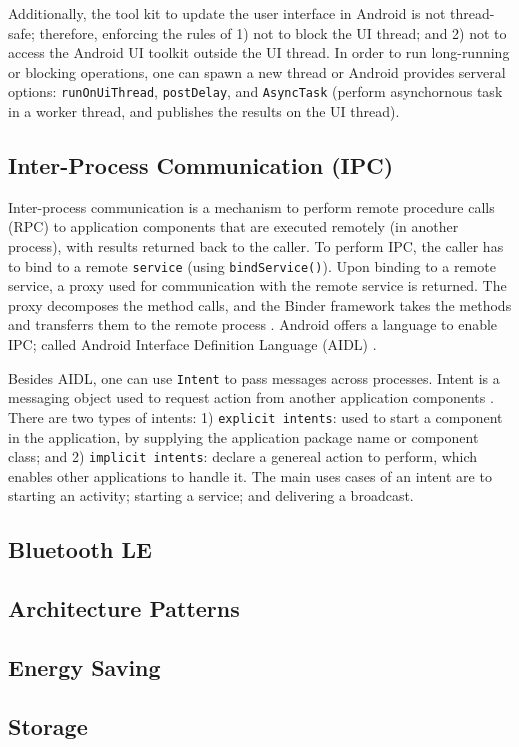 Additionally, the tool kit to update the user interface in Android is not thread-safe; therefore, enforcing the rules of 1) not to block the UI thread; and 2) not to access the Android UI toolkit outside the UI thread. In order to run long-running or blocking operations, one can spawn a new thread or Android provides serveral options: \verb|runOnUiThread|, \verb|postDelay|, and \verb|AsyncTask| (perform asynchornous task in a worker thread, and publishes the results  on the UI thread). 

\subsection{Inter-Process Communication (IPC)}
Inter-process communication is a mechanism to perform remote procedure calls (RPC) to application components that are executed remotely (in another process), with results returned back to the caller. To perform IPC, the caller has to bind to a remote \verb|service| (using \verb|bindService()|). Upon binding to a remote service, a proxy used for communication with the remote service is returned. The proxy decomposes the method calls, and the Binder framework takes the methods and transferrs them to the remote process \cite{binder}. Android offers a language to enable IPC; called Android Interface Definition Language (AIDL) \cite{aidl}. 

Besides AIDL, one can use \verb|Intent| to pass messages across processes. Intent is a messaging object used to request action from another application components \cite{intents}. There are two types of intents: 1) \verb|explicit intents|: used to start a component in the application, by supplying the application package name or component class; and 2) \verb|implicit intents|: declare a genereal action to perform, which enables other applications to handle it. The main uses cases of an intent are to starting an activity; starting a service; and delivering a broadcast.  


\subsection{Bluetooth LE}

\subsection{Architecture Patterns}

\subsection{Energy Saving}

\subsection{Storage}